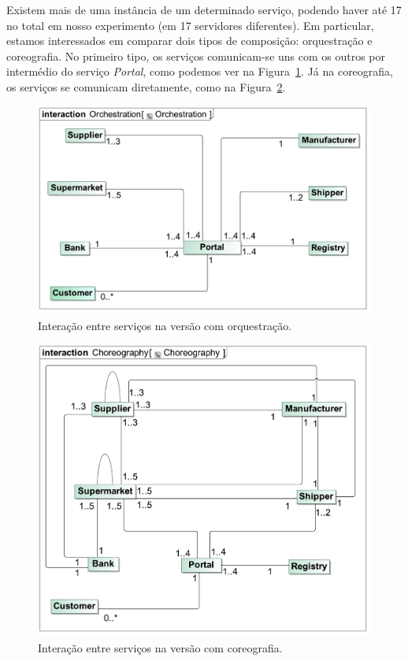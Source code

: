 \documentclass[brazil, a4paper,12pt]{article}
\begin{document}
Existem mais de uma instância de um determinado serviço, podendo haver até 17
no total em nosso experimento (em 17 servidores diferentes). Em particular,
   estamos interessados em comparar dois tipos de composição: orquestração e
   coreografia. No primeiro tipo, os serviços comunicam-se uns com os outros
   por intermédio do serviço \emph{Portal}, como podemos ver na
   Figura~\ref{fig:orch}. Já na coreografia, os serviços se comunicam
   diretamente, como na Figura~\ref{fig:chor}. 

\begin{figure}
  \begin{center}
    \includegraphics[width=\textwidth,clip=true,trim=7mm 9mm 8mm 16mm]{../talk/figures/orch}
    \caption{Interação entre serviços na versão com orquestração.}
    \label{fig:orch}
  \end{center}
\end{figure}

\begin{figure}
  \begin{center}
    \includegraphics[width=\textwidth,clip=true,trim=2mm 10mm 5mm 14mm]{../talk/figures/chor}
    \caption{Interação entre serviços na versão com coreografia.}
    \label{fig:chor}
  \end{center}
\end{figure}
\end{document}
